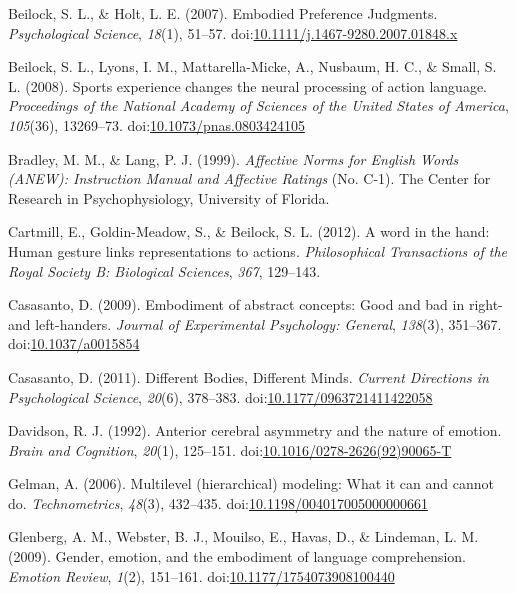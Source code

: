 \documentclass[english,man]{apa6}
\theoremstyle{definition}
\theoremstyle{definition}
\theoremstyle{definition}
\theoremstyle{remark}
\begin{document}
\hypertarget{ref-Beilock2007}{}
Beilock, S. L., \& Holt, L. E. (2007). Embodied Preference Judgments.
\emph{Psychological Science}, \emph{18}(1), 51--57.
doi:\href{https://doi.org/10.1111/j.1467-9280.2007.01848.x}{10.1111/j.1467-9280.2007.01848.x}

\hypertarget{ref-Beilock2008}{}
Beilock, S. L., Lyons, I. M., Mattarella-Micke, A., Nusbaum, H. C., \&
Small, S. L. (2008). Sports experience changes the neural processing of
action language. \emph{Proceedings of the National Academy of Sciences
of the United States of America}, \emph{105}(36), 13269--73.
doi:\href{https://doi.org/10.1073/pnas.0803424105}{10.1073/pnas.0803424105}

\hypertarget{ref-Bradley1999}{}
Bradley, M. M., \& Lang, P. J. (1999). \emph{Affective Norms for English
Words (ANEW): Instruction Manual and Affective Ratings} (No. C-1). The
Center for Research in Psychophysiology, University of Florida.

\hypertarget{ref-Cartmill2012}{}
Cartmill, E., Goldin-Meadow, S., \& Beilock, S. L. (2012). A word in the
hand: Human gesture links representations to actions.
\emph{Philosophical Transactions of the Royal Society B: Biological
Sciences}, \emph{367}, 129--143.

\hypertarget{ref-Casasanto2009}{}
Casasanto, D. (2009). Embodiment of abstract concepts: Good and bad in
right- and left-handers. \emph{Journal of Experimental Psychology:
General}, \emph{138}(3), 351--367.
doi:\href{https://doi.org/10.1037/a0015854}{10.1037/a0015854}

\hypertarget{ref-Casasanto2011}{}
Casasanto, D. (2011). Different Bodies, Different Minds. \emph{Current
Directions in Psychological Science}, \emph{20}(6), 378--383.
doi:\href{https://doi.org/10.1177/0963721411422058}{10.1177/0963721411422058}

\hypertarget{ref-Davidson1992}{}
Davidson, R. J. (1992). Anterior cerebral asymmetry and the nature of
emotion. \emph{Brain and Cognition}, \emph{20}(1), 125--151.
doi:\href{https://doi.org/10.1016/0278-2626(92)90065-T}{10.1016/0278-2626(92)90065-T}

\hypertarget{ref-Gelman2006}{}
Gelman, A. (2006). Multilevel (hierarchical) modeling: What it can and
cannot do. \emph{Technometrics}, \emph{48}(3), 432--435.
doi:\href{https://doi.org/10.1198/004017005000000661}{10.1198/004017005000000661}

\hypertarget{ref-Glenberg2009}{}
Glenberg, A. M., Webster, B. J., Mouilso, E., Havas, D., \& Lindeman, L.
M. (2009). Gender, emotion, and the embodiment of language
comprehension. \emph{Emotion Review}, \emph{1}(2), 151--161.
doi:\href{https://doi.org/10.1177/1754073908100440}{10.1177/1754073908100440}
\end{document}

